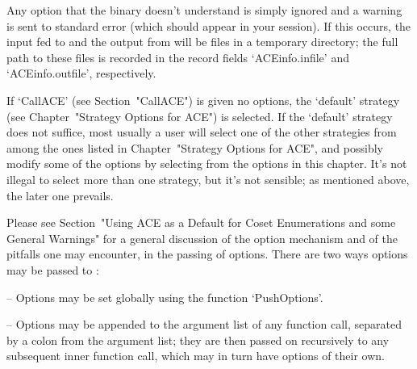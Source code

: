Any option that the {\ACE} binary doesn't understand is simply ignored
and a warning is sent to standard error (which should appear  in  your
{\GAP} session). If this occurs, the  input  fed  to  {\ACE}  and  the
output from {\ACE} will be files in a temporary  directory;  the  full
path to these files is recorded in the record fields  `ACEinfo.infile'
and `ACEinfo.outfile', respectively.

If  `CallACE'  (see  Section~"CallACE")  is  given  no  options,   the
`default'  strategy  (see  Chapter~"Strategy  Options  for  ACE")   is
selected. If the `default' strategy does not suffice, most  usually  a
user will select one of the  other  strategies  from  among  the  ones
listed in Chapter~"Strategy Options for ACE", and possibly modify some
of the options by selecting from the options in this chapter. It's not
illegal to select more than one strategy, but it's  not  sensible;  as
mentioned above, the later one prevails.

Please see Section~"Using ACE as a Default for Coset Enumerations  and
some  General  Warnings"  for  a  general  discussion  of  the  option
mechanism and of the pitfalls one may encounter,  in  the  passing  of
options. There are two ways options may be passed to {\ACE}:

\beginlist

\item{--} Options may be set globally using the function `PushOptions'.

\item{--} Options may be appended to the argument list of any function
call,  separated by a  colon from  the argument  list;  they  are then
passed on recursively to any subsequent inner function call, which may
in turn have options of their own.


\endlist

